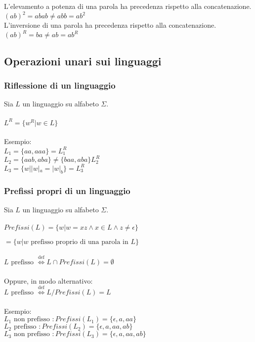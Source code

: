 \documentclass[]{article}
\begin{document}
L'elevamento a potenza di una parola ha precedenza rispetto alla concatenazione.
\\
\mbox{$ (ab)^2 = abab \neq abb = ab^2 $}
\\
L'inversione di una parola ha precedenza rispetto alla concatenazione.
\\
\mbox{$ (ab)^R = ba \neq ab = ab^R $}


\subsection{Operazioni unari sui linguaggi}


\subsubsection{Riflessione di un linguaggio}

Sia \mbox{$ L $} un linguaggio su alfabeto \mbox{$ \Sigma $}.
\\
\\
\mbox{$ L^R = \{ w^R | w \in L \} $}
\\
\\
Esempio:
\\
\mbox{$ L_1 = \{ aa, aaa \} = L_1^R $}
\\
\mbox{$ L_2 = \{ aab, aba \} \neq \{ baa, aba \} L_2^R $}
\\
\mbox{$ L_3 = \{ w | |w|_a = |w|_b \} = L_3^R $}



\subsubsection{Prefissi propri di un linguaggio}

Sia \mbox{$ L $} un linguaggio su alfabeto \mbox{$ \Sigma $}.
\\
\\
\mbox{$ Prefissi(L) = \{ w | w = xz \land x \in L \land z \neq \epsilon \} $}

\mbox{$ = \{ w | w \text{ prefisso proprio di una parola in } L \} $}
\\
\\
\mbox{$ L \text{ prefisso } \overset{\text{def}}{\Leftrightarrow}
L \cap Prefissi(L) = \emptyset $}
\\
\\
Oppure, in modo alternativo:
\\
\mbox{$ L \text{ prefisso } \overset{\text{def}}{\Leftrightarrow}
L / Prefissi(L) = L $}
\\
\\
Esempio:
\\
\mbox{$ L_1 \text{ non prefisso } \colon Prefissi(L_1) = \{ \epsilon, a, aa \} $}
\\
\mbox{$ L_2 \text{ prefisso } \colon Prefissi(L_2) = \{ \epsilon, a, aa, ab \} $}
\\
\mbox{$ L_3 \text{ non prefisso } \colon Prefissi(L_3) = \{ \epsilon, a, aa, ab \} $}
\end{document}
